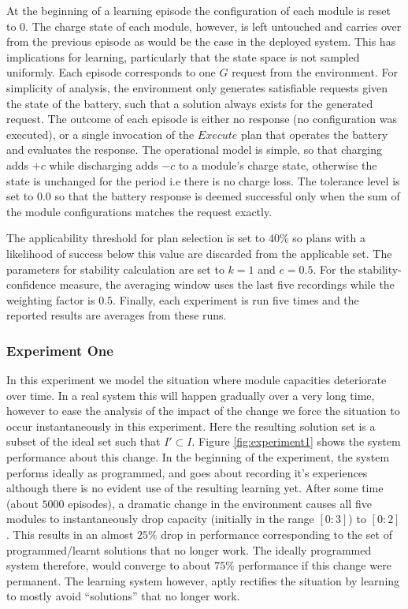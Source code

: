 At the beginning of a learning episode the configuration of each module is reset to $0$. The charge state of each module, however, is left untouched and carries over from the previous episode as would be the case in the deployed system. This has implications for learning, particularly that the state space is not sampled uniformly. Each episode corresponds to one $G$ request from the environment. For simplicity of analysis, the environment only generates satisfiable requests given the state of the battery, such that a solution always exists for the generated request. The outcome of each episode is either no response (no configuration was executed), or a single invocation of the $Execute$ plan that operates the battery and evaluates the response. The operational model is simple, so that charging adds $+c$ while discharging adds $-c$ to a module's charge state, otherwise the state is unchanged for the period i.e there is no charge loss. The tolerance level is set to $0.0$ so that the battery response is deemed successful only when the sum of the module configurations matches the request exactly.

The applicability threshold for plan selection is set to $40\%$ so plans with a likelihood of success below this value are discarded from the applicable set. The parameters for stability calculation are set to $k=1$ and $e=0.5$. For the stability-confidence measure, the averaging window uses the last five recordings while the weighting factor is $0.5$. Finally, each experiment is run five times and the reported results are averages from these runs.

\subsubsection{Experiment One}

In this experiment we model the situation where module capacities deteriorate over time. In a real system this will happen gradually over a very long time, however to ease the analysis of the impact of the change we force the situation to occur instantaneously in this experiment. Here the resulting solution set is a subset of the ideal set such that $I' \subset I$. Figure \ref{fig:experiment1} shows the system performance about this change. In the beginning of the experiment, the system performs ideally as programmed, and goes about recording it's experiences although there is no evident use of the resulting learning yet. After some time (about $5000$ episodes), a dramatic change in the environment causes all five modules to instantaneously drop capacity (initially in the range $[0:3]$) to $[0:2]$. This results in an almost $25\%$ drop in performance corresponding to the set of programmed/learnt solutions that no longer work. The ideally programmed system therefore, would converge to about $75\%$ performance if this change were permanent. The learning system however, aptly rectifies the situation by learning to mostly avoid ``solutions'' that no longer work. 


